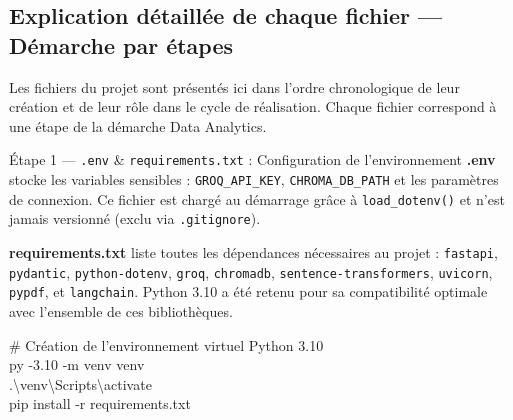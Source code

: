 \documentclass[12pt, a4paper]{report}
\begin{document}
\subsection{Explication détaillée de chaque fichier — Démarche par étapes}

Les fichiers du projet sont présentés ici dans l'ordre chronologique de leur création et de leur rôle dans le cycle de réalisation. Chaque fichier correspond à une étape de la démarche Data Analytics.

\bigskip

\begin{stepbox}{Étape 1 — \texttt{.env} \& \texttt{requirements.txt} : Configuration de l'environnement}
\textbf{.env} stocke les variables sensibles : \texttt{GROQ\_API\_KEY}, \texttt{CHROMA\_DB\_PATH} et les paramètres de connexion. Ce fichier est chargé au démarrage grâce à \texttt{load\_dotenv()} et n'est jamais versionné (exclu via \texttt{.gitignore}).

\medskip
\textbf{requirements.txt} liste toutes les dépendances nécessaires au projet : \texttt{fastapi}, \texttt{pydantic}, \texttt{python-dotenv}, \texttt{groq}, \texttt{chromadb}, \texttt{sentence-transformers}, \texttt{uvicorn}, \texttt{pypdf}, et \texttt{langchain}. Python 3.10 a été retenu pour sa compatibilité optimale avec l'ensemble de ces bibliothèques.

\begin{codebox}
\# Création de l'environnement virtuel Python 3.10\\
py -3.10 -m venv venv\\
.{\textbackslash}venv{\textbackslash}Scripts{\textbackslash}activate\\
pip install -r requirements.txt
\end{codebox}
\end{stepbox}

\bigskip
\end{document}
